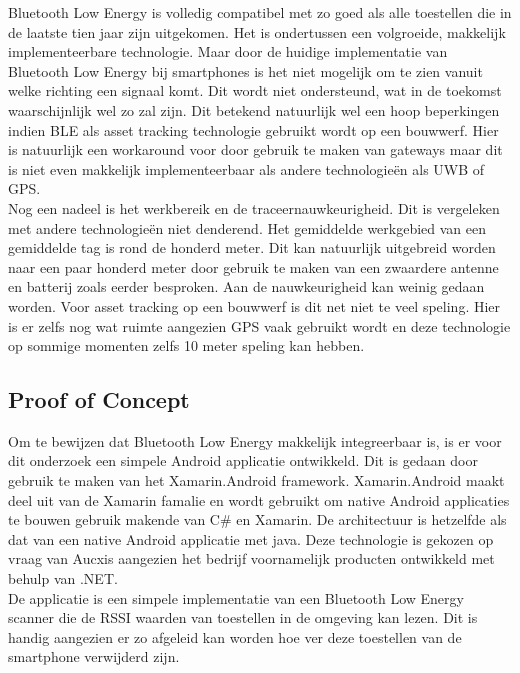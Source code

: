 Bluetooth Low Energy is volledig compatibel met zo goed als alle toestellen die in de laatste tien jaar zijn uitgekomen. Het is ondertussen een volgroeide, makkelijk implementeerbare technologie. Maar door de huidige implementatie van Bluetooth Low Energy bij smartphones is het niet mogelijk om te zien vanuit welke richting een signaal komt. Dit wordt niet ondersteund, wat in de toekomst waarschijnlijk wel zo zal zijn. Dit betekend natuurlijk wel een hoop beperkingen indien BLE als asset tracking technologie gebruikt wordt op een bouwwerf. Hier is natuurlijk een workaround voor door gebruik te maken van gateways maar dit is niet even makkelijk implementeerbaar als andere technologieën als UWB of GPS.\\

Nog een nadeel is het werkbereik en de traceernauwkeurigheid. Dit is vergeleken met andere technologieën niet denderend. Het gemiddelde werkgebied van een gemiddelde tag is rond de honderd meter. Dit kan natuurlijk uitgebreid worden naar een paar honderd meter door gebruik te maken van een zwaardere antenne en batterij zoals eerder besproken. Aan de nauwkeurigheid kan weinig gedaan worden. Voor asset tracking op een bouwwerf is dit net niet te veel speling. Hier is er zelfs nog wat ruimte aangezien GPS vaak gebruikt wordt en deze technologie op sommige momenten zelfs 10 meter speling kan hebben.

\subsection{Proof of Concept}
Om te bewijzen dat Bluetooth Low Energy makkelijk integreerbaar is, is er voor dit onderzoek een simpele Android applicatie ontwikkeld. Dit is gedaan door gebruik te maken van het Xamarin.Android framework. Xamarin.Android maakt deel uit van de Xamarin famalie en wordt gebruikt om native Android applicaties te bouwen gebruik makende van C# en Xamarin. De architectuur is hetzelfde als dat van een native Android applicatie met java. Deze technologie is gekozen op vraag van Aucxis aangezien het bedrijf voornamelijk producten ontwikkeld met behulp van .NET.\\

De applicatie is een simpele implementatie van een Bluetooth Low Energy scanner die de RSSI waarden van toestellen in de omgeving kan lezen. Dit is handig aangezien er zo afgeleid kan worden hoe ver deze toestellen van de smartphone verwijderd zijn.\\

